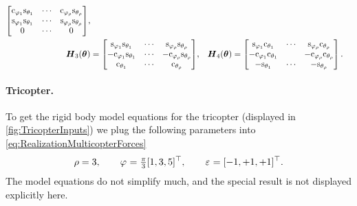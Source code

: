 \begin{subequations}
\begin{align}
\begin{bmatrix}
  \cArmAngle[1] \sPropTilt[1] & \cdots & \cArmAngle[\numProp] \sPropTilt[\numProp] \\
  \sArmAngle[1] \sPropTilt[1] & \cdots & \sArmAngle[\numProp] \sPropTilt[\numProp] \\
  0 & \cdots & 0
 \end{bmatrix}\!,
\\
 \mat{H}_3(\tuple{\PropTilt}) &= \begin{bmatrix}
   \sArmAngle[1] \sPropTilt[1] & \cdots &  \sArmAngle[\numProp] \sPropTilt[\numProp] \\
  -\cArmAngle[1] \sPropTilt[1] & \cdots & -\cArmAngle[\numProp] \sPropTilt[\numProp] \\
   \cPropTilt[1]               & \cdots &  \cPropTilt[\numProp]                     
 \end{bmatrix}\!,&
 \mat{H}_4(\tuple{\PropTilt}) &= \begin{bmatrix}
  \sArmAngle[1] \cPropTilt[1] & \cdots & \sArmAngle[\numProp] \cPropTilt[\numProp] \\
  -\cArmAngle[1] \cPropTilt[1] & & -\cArmAngle[\numProp] \cPropTilt[\numProp] \\
  -\sPropTilt[1] & \cdots & -\sPropTilt[\numProp]
 \end{bmatrix}
.
\end{align}
\end{subequations}

\paragraph{Tricopter.}
To get the rigid body model equations for the tricopter (displayed in \autoref{fig:TricopterInputs}) we plug the following parameters into \eqref{eq:RealizationMulticopterForces}
\begin{align}
 \numProp = 3,
\qquad
 \ArmAngle = \tfrac{\pi}{3} [1, 3, 5]^\top,
\qquad
 \PropDir = [-1, +1, +1]^\top.
\end{align}
The model equations do not simplify much, and the special result is not displayed explicitly here.

